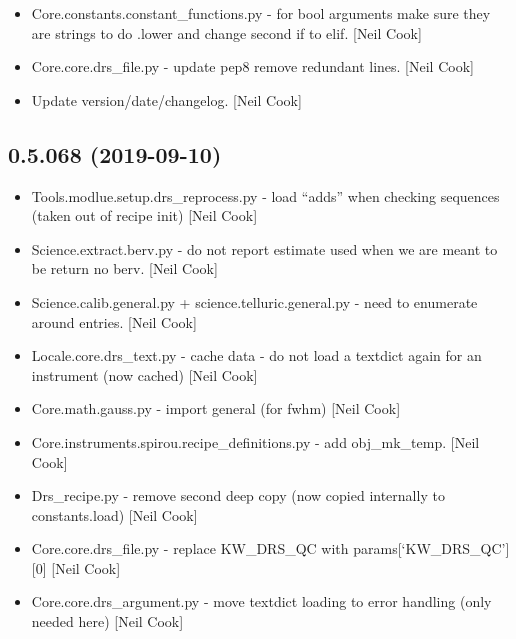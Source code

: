 \documentclass[a4paper,10pt,english]{report}
\begin{document}
\begin{itemize}
\item {} 
Core.constants.constant\_functions.py - for bool arguments make sure
they are strings to do .lower and change second if to elif. {[}Neil
Cook{]}

\item {} 
Core.core.drs\_file.py - update pep8 remove redundant lines. {[}Neil
Cook{]}

\item {} 
Update version/date/changelog. {[}Neil Cook{]}

\end{itemize}


\subsection{0.5.068 (2019-09-10)}
\label{\detokenize{misc/changelog:id73}}\begin{itemize}
\item {} 
Tools.modlue.setup.drs\_reprocess.py - load “adds” when checking
sequences (taken out of recipe init) {[}Neil Cook{]}

\item {} 
Science.extract.berv.py - do not report estimate used when we are
meant to be return no berv. {[}Neil Cook{]}

\item {} 
Science.calib.general.py + science.telluric.general.py - need to
enumerate around entries. {[}Neil Cook{]}

\item {} 
Locale.core.drs\_text.py - cache data - do not load a textdict again
for an instrument (now cached) {[}Neil Cook{]}

\item {} 
Core.math.gauss.py - import general (for fwhm) {[}Neil Cook{]}

\item {} 
Core.instruments.spirou.recipe\_definitions.py - add obj\_mk\_temp. {[}Neil
Cook{]}

\item {} 
Drs\_recipe.py - remove second deep copy (now copied internally to
constants.load) {[}Neil Cook{]}

\item {} 
Core.core.drs\_file.py - replace KW\_DRS\_QC with params{[}‘KW\_DRS\_QC’{]}{[}0{]}
{[}Neil Cook{]}

\item {} 
Core.core.drs\_argument.py - move textdict loading to error handling
(only needed here) {[}Neil Cook{]}


\end{itemize}
\end{document}
